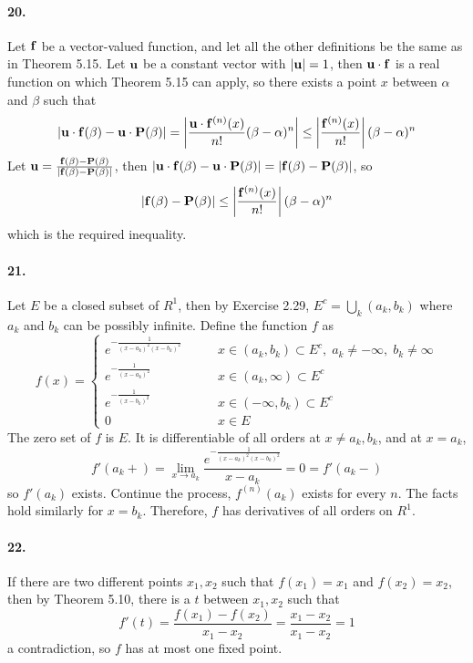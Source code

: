 \documentclass[a4paper]{article}
\begin{document}
\paragraph{20.}
Let $\mathbf{f}$ be a vector-valued function, and let all the other definitions be the same as in Theorem 5.15. Let $\mathbf{u}$ be a constant vector with $|\mathbf{u}|=1$, then $\mathbf{u}\cdot\mathbf{f}$ is a real function on which Theorem 5.15 can apply, so there exists a point $x$ between $\alpha$ and $\beta$ such that
\[
\left|\mathbf{u}\cdot\mathbf{f}(\beta)-\mathbf{u}\cdot\mathbf{P}(\beta) \right|=\left|\frac{\mathbf{u}\cdot\mathbf{f}^{(n)}(x)}{n!}(\beta-\alpha)^n \right|\leq\left|\frac{\mathbf{f}^{(n)}(x)}{n!} \right|(\beta-\alpha)^n
\]
Let $\mathbf{u}=\frac{\mathbf{f}(\beta)-\mathbf{P}(\beta)}{|\mathbf{f}(\beta)-\mathbf{P}(\beta)|}$, then $|\mathbf{u}\cdot\mathbf{f}(\beta)-\mathbf{u}\cdot\mathbf{P}(\beta)|=|\mathbf{f}(\beta)-\mathbf{P}(\beta)|$, so
\[
\left|\mathbf{f}(\beta)-\mathbf{P}(\beta) \right|\leq\left|\frac{\mathbf{f}^{(n)}(x)}{n!} \right|(\beta-\alpha)^n
\]
which is the required inequality.

\paragraph{21.}
Let $E$ be a closed subset of ${R}^1$, then by Exercise 2.29,\; $E^c=\bigcup_k(a_k,b_k)$ where $a_k$ and $b_k$ can be possibly infinite. Define the function $f$ as
\[
f(x)=\begin{cases}
e^{-\frac{1}{(x-a_k)^2(x-b_k)^2}}\qquad & x\in(a_k,b_k)\subset E^c,\; a_k\neq-\infty,\; b_k\neq\infty\\
e^{-\frac{1}{(x-a_k)^2}}\qquad & x\in(a_k,\infty)\subset E^c\\
e^{-\frac{1}{(x-b_k)^2}}\qquad & x\in(-\infty,b_k)\subset E^c\\
0\qquad & x\in E
\end{cases}
\]
The zero set of $f$ is $E$. It is differentiable of all orders at $x\neq a_k,b_k$, and at $x=a_k$, 
\[
f'(a_k+)=\lim_{x\to a_k}\frac{e^{-\frac{1}{(x-a_k)^2(x-b_k)^2}}}{x-a_k}=0=f'(a_k-)
\]
so $f'(a_k)$ exists. Continue the process, $f^{(n)}(a_k)$ exists for every $n$. The facts hold similarly for $x=b_k$. Therefore, $f$ has derivatives of all orders on $R^1$.

\paragraph{22.}
If there are two different points $x_1,x_2$ such that $f(x_1)=x_1$ and $f(x_2)=x_2$, then by Theorem 5.10, there is a $t$ between $x_1,x_2$ such that
\[
f'(t)=\frac{f(x_1)-f(x_2)}{x_1-x_2}=\frac{x_1-x_2}{x_1-x_2}=1
\]
a contradiction, so $f$ has at most one fixed point.
\medskip
\end{document}
